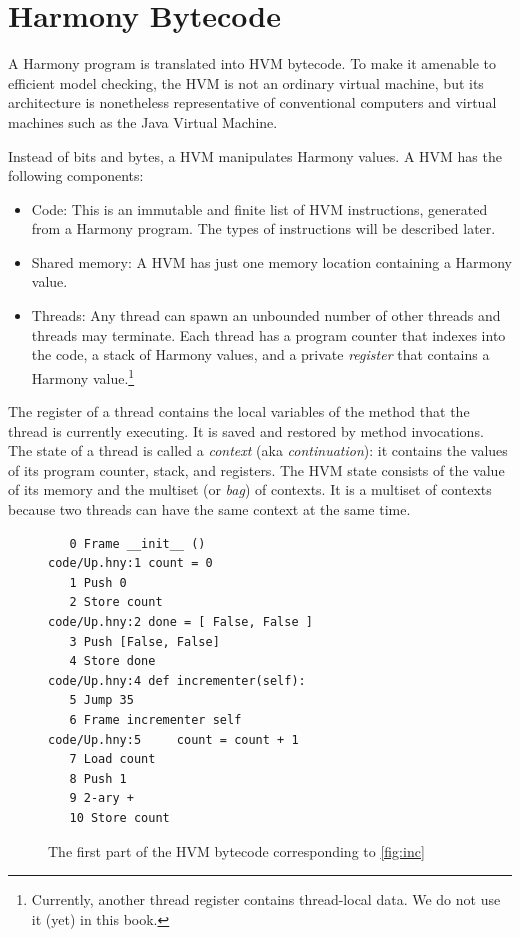 \documentclass{report}
\newenvironment{code}{
\tcolorbox
}{
\endtcolorbox
}
\begin{document}
\section*{Harmony Bytecode}

A Harmony program is translated into HVM bytecode.
To make it amenable to efficient model checking,
the HVM is not an ordinary virtual machine, but its architecture
is nonetheless representative of conventional computers and
virtual machines such as the Java Virtual Machine.

%
%
%
Instead of bits and bytes, a HVM manipulates Harmony values.
A HVM has the following components:
\begin{itemize}
\item Code:  This is an immutable and finite list of HVM instructions,
generated from a Harmony program.  The types of instructions will be described later.
\item Shared memory: A HVM has just one memory location containing
a Harmony value.
\item Threads:  Any thread
can spawn an unbounded number of other threads and threads may terminate.
Each thread has a program counter that indexes into the code,
%
a stack of Harmony values,
and a private \emph{register} that contains a
Harmony value.\footnote{Currently, another thread register
contains thread-local data.  We do not use it (yet) in this book.}
\end{itemize}

The register of a thread contains the local variables of the
method that the thread is currently executing.  It is saved and restored by
method invocations.
The state of a thread is called a \emph{context} (aka \emph{continuation}):
%
%
it contains the values of its program counter, stack, and registers.
The HVM state
consists of the value of its memory and the multiset (or \emph{bag})
%
%
of contexts.  It is a multiset of contexts because two threads can
have the same context at the same time.

\begin{figure}
\begin{code}
\begin{verbatim}
   0 Frame __init__ ()
code/Up.hny:1 count = 0
   1 Push 0
   2 Store count
code/Up.hny:2 done = [ False, False ]
   3 Push [False, False]
   4 Store done
code/Up.hny:4 def incrementer(self):
   5 Jump 35
   6 Frame incrementer self
code/Up.hny:5     count = count + 1
   7 Load count
   8 Push 1
   9 2-ary +
   10 Store count
\end{verbatim}
\end{code}
\caption{The first part of the HVM bytecode corresponding to \autoref{fig:inc}}
\label{fig:inccode}
\end{figure}
\end{document}
